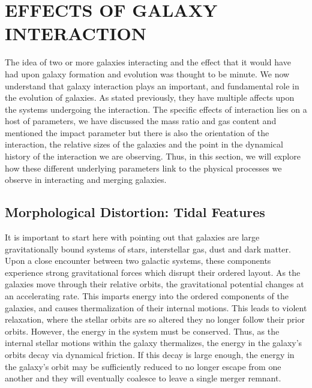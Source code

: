 \section{EFFECTS OF GALAXY INTERACTION}\label{sec:int_effects}
The idea of two or more galaxies interacting and the effect that it would have had upon galaxy formation and evolution was thought to be minute. We now understand that galaxy interaction plays an important, and fundamental role in the evolution of galaxies. As stated previously, they have multiple affects upon the systems undergoing the interaction. The specific effects of interaction lies on a host of parameters, we have discussed the mass ratio and gas content and mentioned the impact parameter but there is also the orientation of the interaction, the relative sizes of the galaxies and the point in the dynamical history of the interaction we are observing. Thus, in this section, we will explore how these different underlying parameters link to the physical processes we observe in interacting and merging galaxies.

\subsection{Morphological Distortion: Tidal Features}
\noindent It is important to start here with pointing out that galaxies are large gravitationally bound systems of stars, interstellar gas, dust and dark matter. Upon a close encounter between two galactic systems, these components experience strong gravitational forces which disrupt their ordered layout. As the galaxies move through their relative orbits, the gravitational potential changes at an accelerating rate. This imparts energy into the ordered components of the galaxies, and causes thermalization of their internal motions. This leads to violent relaxation, where the stellar orbits are so altered they no longer follow their prior orbits. However, the energy in the system must be conserved. Thus, as the internal stellar motions within the galaxy thermalizes, the energy in the galaxy's orbits decay via dynamical friction. If this decay is large enough, the energy in the galaxy's orbit may be sufficiently reduced to no longer escape from one another and they will eventually coalesce to leave a single merger remnant. 

